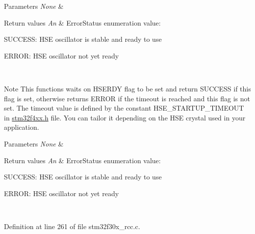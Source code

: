 \begin{DoxyParams}{Parameters}
{\em None} & \\
\hline
\end{DoxyParams}

\begin{DoxyRetVals}{Return values}
{\em An} & Error\-Status enumeration value\-:
\begin{DoxyItemize}
\item S\-U\-C\-C\-E\-S\-S\-: H\-S\-E oscillator is stable and ready to use
\item E\-R\-R\-O\-R\-: H\-S\-E oscillator not yet ready
\end{DoxyItemize}\\
\hline
\end{DoxyRetVals}
\begin{DoxyNote}{Note}
This functions waits on H\-S\-E\-R\-D\-Y flag to be set and return S\-U\-C\-C\-E\-S\-S if this flag is set, otherwise returns E\-R\-R\-O\-R if the timeout is reached and this flag is not set. The timeout value is defined by the constant H\-S\-E\-\_\-\-S\-T\-A\-R\-T\-U\-P\-\_\-\-T\-I\-M\-E\-O\-U\-T in \hyperlink{stm32f4xx_8h}{stm32f4xx.\-h} file. You can tailor it depending on the H\-S\-E crystal used in your application. 
\end{DoxyNote}

\begin{DoxyParams}{Parameters}
{\em None} & \\
\hline
\end{DoxyParams}

\begin{DoxyRetVals}{Return values}
{\em An} & Error\-Status enumeration value\-:
\begin{DoxyItemize}
\item S\-U\-C\-C\-E\-S\-S\-: H\-S\-E oscillator is stable and ready to use
\item E\-R\-R\-O\-R\-: H\-S\-E oscillator not yet ready 
\end{DoxyItemize}\\
\hline
\end{DoxyRetVals}


Definition at line 261 of file stm32f30x\-\_\-rcc.\-c.

